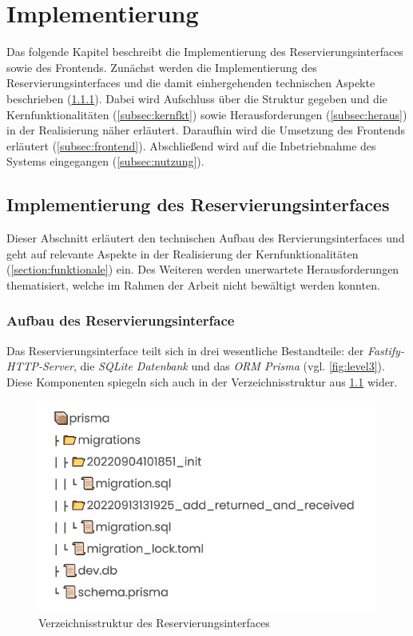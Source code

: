 
\chapter{Implementierung}
\label{chapter-implementierung}
Das folgende Kapitel beschreibt die Implementierung des Reservierungsinterfaces sowie des Frontends.
Zunächst werden die Implementierung des Reservierungsinterfaces und die damit einhergehenden
technischen Aspekte beschrieben (\ref{subsec:aufbauinterface}). Dabei wird Aufschluss über die
Struktur gegeben und die Kernfunktionalitäten (\ref{subsec:kernfkt}) sowie Herausforderungen
(\ref{subsec:heraus}) in der Realisierung näher erläutert. Daraufhin wird die Umsetzung des
Frontends erläutert (\ref{subsec:frontend}). Abschließend wird auf die Inbetriebnahme des Systems
eingegangen (\ref{subsec:nutzung}).

\section{Implementierung des Reservierungsinterfaces}
\label{sec:interface}
Dieser Abschnitt erläutert den technischen Aufbau des Rervierungsinterfaces und geht auf relevante
Aspekte in der Realisierung der Kernfunktionalitäten (\ref{section:funktionale}) ein. Des Weiteren
werden unerwartete Herausforderungen thematisiert, welche im Rahmen der Arbeit nicht bewältigt
werden konnten.


\subsection{Aufbau des Reservierungsinterface}
\label{subsec:aufbauinterface}
Das Reservierungsinterface teilt sich in drei wesentliche Bestandteile: der
\textit{Fastify-HTTP-Server}, die \textit{SQLite Datenbank} und das \textit{ORM Prisma} (vgl.
\ref{fig:level3}). Diese Komponenten spiegeln sich auch in der Verzeichnisstruktur aus \ref{fig:db}
wider.

\begin{figure}[h]
  \centering
  \includegraphics[scale=0.7]{Bilder/Db.jpg}
  \caption[Verzeichnisstruktur des Reservierungsinterfaces]{Verzeichnisstruktur des Reservierungsinterfaces}
  \label{fig:db}
\end{figure}

